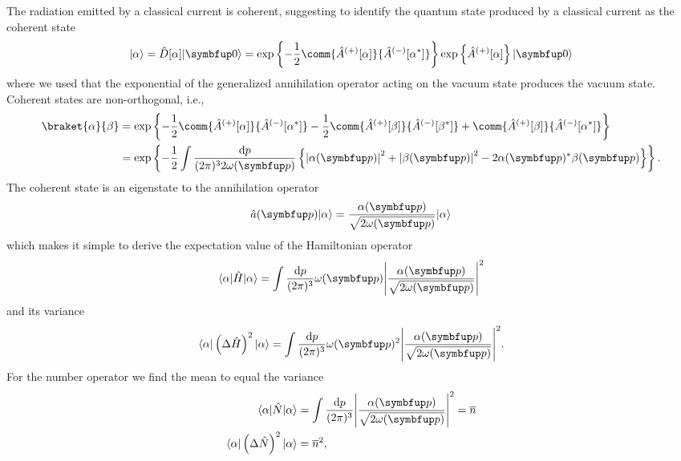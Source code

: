 The radiation emitted by a classical current is coherent, suggesting to identify the quantum state produced by a classical current as the coherent state
\begin{equation}
	\ket{\alpha}
	=
	\hat{D}[\alpha]
	\vacket
	=
	\exp\left\{
		-
		\frac{1}{2}
		\comm{\hat{A}^{(+)}[\alpha]}{\hat{A}^{(-)}[\alpha^*]}
	\right\}
	\exp\left\{
		\hat{A}^{(+)}[\alpha]
	\right\}
	\vacket
	\label{eq:coherent_state}
\end{equation}
where we used that the exponential of the generalized annihilation operator acting on the vacuum state produces the vacuum state.
Coherent states are non-orthogonal, i.e.,
\begin{equation}
	\begin{split}
		\braket{\alpha}{\beta}
		&=
		\exp\left\{
			-
			\frac{1}{2}
			\comm{\hat{A}^{(+)}[\alpha]}{\hat{A}^{(-)}[\alpha^*]}
			-
			\frac{1}{2}
			\comm{\hat{A}^{(+)}[\beta]}{\hat{A}^{(-)}[\beta^*]}
			+
			\comm{\hat{A}^{(+)}[\beta]}{\hat{A}^{(-)}[\alpha^*]}
		\right\}
		\\
		&=
		\exp\left\{
			-
			\frac{1}{2}
			\int\frac{\dd{p}}{(2\pi)^32\omega(\vb{p})}
			\left\{
				\abs*{\alpha(\vb{p})}^2
				+
				\abs*{\beta(\vb{p})}^2
				-
				2\alpha(\vb{p})^*\beta(\vb{p})
			\right\}
		\right\}
		\label{eq:coherent_state_inner}
		.
	\end{split}
\end{equation}
The coherent state is an eigenstate to the annihilation operator
\begin{equation}
	\hat{a}(\vb{p})
	\ket{\alpha}
	=
	\frac{\alpha(\vb{p})}{\sqrt{2\omega(\vb{p})}}
	\ket{\alpha}
	\label{eq:coherent_state_annihilation}
\end{equation}
which makes it simple to derive the expectation value of the Hamiltonian operator
\begin{equation}
	\bra{\alpha}
	\hat{H}
	\ket{\alpha}
	=
	\int\frac{\dd{p}}{(2\pi)^3}
	\omega(\vb{p})
	\abs*{\frac{\alpha(\vb{p})}{\sqrt{2\omega(\vb{p})}}}^2
	\label{eq:coherent_state_hamilton_expval}
\end{equation}
and its variance
\begin{equation}
	\bra{\alpha}
	\left(
		\Delta
		\hat{H}
	\right)^2
	\ket{\alpha}
	=
	\int\frac{\dd{p}}{(2\pi)^3}
	\omega(\vb{p})^2
	\abs*{\frac{\alpha(\vb{p})}{\sqrt{2\omega(\vb{p})}}}^2
	\label{eq:coherent_state_hamilton_variance}
	.
\end{equation}
For the number operator we find the mean to equal the variance
\begin{align}
	\bra{\alpha}
	\hat{N}
	\ket{\alpha}
	&=
	\int\frac{\dd{p}}{(2\pi)^3}
	\abs*{\frac{\alpha(\vb{p})}{\sqrt{2\omega(\vb{p})}}}^2
	=
	\overline{n}
	\label{eq:coherent_state_number_expval}
	\\
	\bra{\alpha}
	\left(
		\Delta
		\hat{N}
	\right)^2
	\ket{\alpha}
	&=
	\overline{n}^2
	\label{eq:coherent_state_number_variance}
	,
\end{align}
